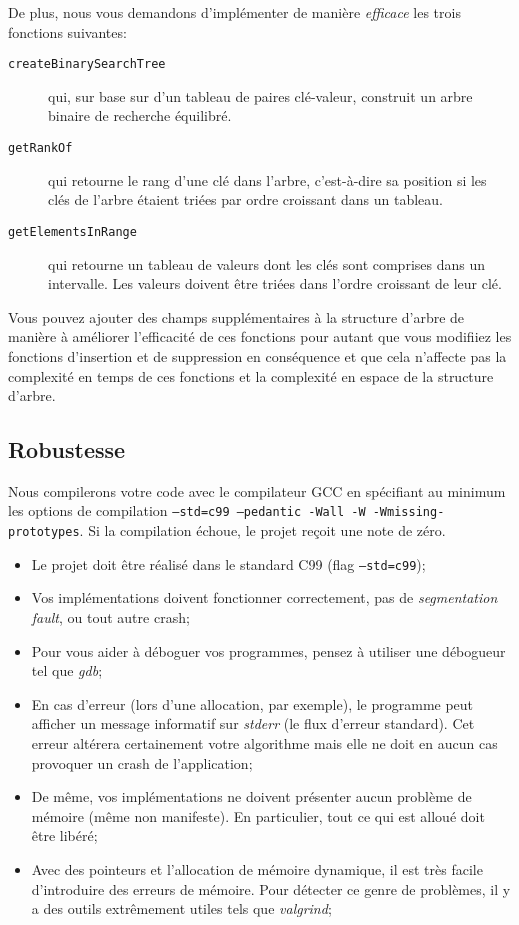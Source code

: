 \documentclass[a4paper,10pt]{article}
\begin{document}
De plus, nous vous demandons d'implémenter de manière {\em efficace} les trois fonctions suivantes:
\begin{description}
\item[\texttt{createBinarySearchTree}] qui, sur base sur d'un tableau
  de paires clé-valeur, construit un arbre binaire de recherche
  équilibré. %
\item[\texttt{getRankOf}] qui retourne le rang d'une clé dans l'arbre,
  c'est-à-dire sa position si les clés de l'arbre étaient triées par
  ordre croissant dans un tableau.
\item[\texttt{getElementsInRange}] qui retourne un tableau de valeurs
  dont les clés sont comprises dans un intervalle. Les valeurs doivent
  être triées dans l'ordre croissant de leur clé.
\end{description}
Vous pouvez ajouter des champs supplémentaires à la structure d'arbre
de manière à améliorer l'efficacité de ces fonctions pour autant que
vous modifiiez les fonctions d'insertion et de suppression en
conséquence et que cela n'affecte pas la complexité en temps de ces
fonctions et la complexité en espace de la structure d'arbre.

\subsection*{Robustesse}

Nous compilerons votre code avec le compilateur GCC en spécifiant au
minimum les options de compilation \texttt{--std=c99 --pedantic -Wall -W -Wmissing-
prototypes}. Si la compilation échoue, le projet reçoit une note de zéro.

\begin{itemize}
\item Le projet doit être réalisé dans le standard C99 (flag
  \texttt{--std=c99});
\item Vos implémentations doivent fonctionner correctement, pas de
  {\em segmentation fault}, ou tout autre crash;
\item Pour vous aider à déboguer vos programmes, pensez à utiliser une
  débogueur tel que {\em gdb};
\item En cas d'erreur (lors d'une allocation, par exemple), le
  programme peut afficher un message informatif sur {\em stderr} (le
  flux d'erreur standard). Cet erreur altérera certainement votre
  algorithme mais elle ne doit en aucun cas provoquer un crash de
  l'application;
\item De même, vos implémentations ne doivent présenter aucun problème
  de mémoire (même non manifeste). En particulier, tout ce qui est
  alloué doit être libéré;
\item Avec des pointeurs et l’allocation de mémoire dynamique, il est
  très facile d’introduire des erreurs de mémoire. Pour détecter ce
  genre de problèmes, il y a des outils extrêmement utiles tels que
  {\em valgrind};
\end{itemize}
\end{document}
